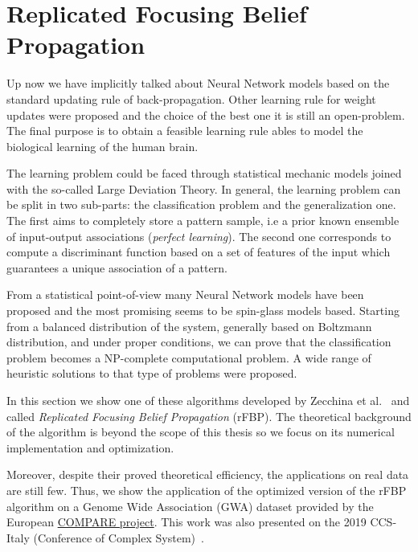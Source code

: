 \documentclass{standalone}
\begin{document}
\section[rFBP]{Replicated Focusing Belief Propagation}\label{rfbp:rfbp}

Up now we have implicitly talked about Neural Network models based on the standard updating rule of back-propagation.
Other learning rule for weight updates were proposed and the choice of the best one it is still an open-problem.
The final purpose is to obtain a feasible learning rule ables to model the biological learning of the human brain.

The learning problem could be faced through statistical mechanic models joined with the so-called Large Deviation Theory.
In general, the learning problem can be split in two sub-parts: the classification problem and the generalization one.
The first aims to completely store a pattern sample, i.e a prior known ensemble of input-output associations (\emph{perfect learning}).
The second one corresponds to compute a discriminant function based on a set of features of the input which guarantees a unique association of a pattern.

From a statistical point-of-view many Neural Network models have been proposed and the most promising seems to be spin-glass models based.
Starting from a balanced distribution of the system, generally based on Boltzmann distribution, and under proper conditions, we can prove that the classification problem becomes a NP-complete computational problem.
A wide range of heuristic solutions to that type of problems were proposed.

In this section we show one of these algorithms developed by Zecchina et al.~\cite{BaldassiE7655} and called \emph{Replicated Focusing Belief Propagation} (rFBP).
The theoretical background of the algorithm is beyond the scope of this thesis so we focus on its numerical implementation and optimization.

Moreover, despite their proved theoretical efficiency, the applications on real data are still few.
Thus, we show the application of the optimized version of the rFBP algorithm on a Genome Wide Association (GWA) dataset provided by the European \href{https://www.compare-europe.eu/}{COMPARE project}.
This work was also presented on the 2019 CCS-Italy (Conference of Complex System)~\cite{DallOlioCCS19}.
\end{document}
